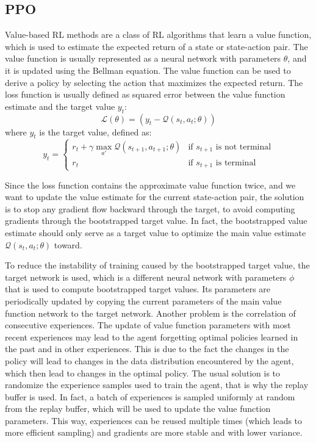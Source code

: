 \subsection{PPO}
Value-based RL methods are a class of RL algorithms that learn a value function, which is used to estimate the expected return of a state or state-action pair. The value function is usually represented as a neural network with parameters $\theta$, and it is updated using the Bellman equation. The value function can be used to derive a policy by selecting the action that maximizes the expected return.
The loss function is usually defined as squared error between the value function estimate and the target value $y_t$:
\begin{equation}
    \mathcal{L}(\theta) = \left(y_t - \mathcal{Q}(s_t,a_t;\theta)\right)
\end{equation}
where $y_t$ is the target value, defined as:
\begin{equation}
    y_t = \begin{cases}
        r_t + \gamma \max_{a'}\mathcal{Q}(s_{t+1},a_{t+1};\theta) & \text{if } s_{t+1} \text{ is not terminal} \\
        r_t & \text{if } s_{t+1} \text{ is terminal}
    \end{cases}
\end{equation}

Since the loss function contains the approximate value function twice, and we want to update the value estimate for the current state-action pair,
the solution is to stop any gradient flow backward through the target, to avoid computing gradients through the bootstrapped target value. In fact, 
the bootstrapped value estimate should only serve as a target value to optimize the main value estimate $\mathcal{Q}(s_t,a_t;\theta)$ toward.

To reduce the instability of training caused by the bootstrapped target value,
the target network is used, which is a different neural network with parameters $\phi$ that is used to compute bootstrapped target values.
Its parameters are periodically updated by copying the current parameters of the main value function network to the target network.
Another problem is the correlation of consecutive experiences. The update of value function parameters with most recent experiences may lead 
to the agent forgetting optimal policies learned in the past and in other experiences. This is due to the fact the changes in the policy will lead to 
changes in the data distribution encountered by the agent, which then lead to changes in the optimal policy. The usual solution is to randomize the experience samples used to train the agent,
that is why the replay buffer is used. In fact, a batch of experiences is sampled uniformly at random from the replay buffer, which will be used to 
update the value function parameters. This way, experiences can be reused multiple times (which leads to more efficient sampling) and gradients are more stable and with lower variance.


